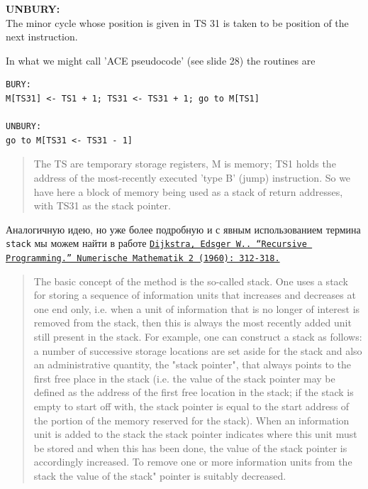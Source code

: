 \textbf{UNBURY:}\\
The minor cycle whose position is given in TS 31 is taken to be position of the next instruction.

In what we might call 'ACE pseudocode' (see slide 28) the routines are
\begin{lstlisting}[caption={}, label={}, style=style_code_block]
BURY:
M[TS31] <- TS1 + 1; TS31 <- TS31 + 1; go to M[TS1]

UNBURY:
go to M[TS31 <- TS31 - 1]
\end{lstlisting}

\begin{quotation}
  The TS are temporary storage registers, M is memory; TS1 holds the address of the most-recently executed 'type B' (jump) instruction. So we have here a block of memory being used as a stack of return addresses, with TS31 as the stack pointer.
\end{quotation}

Аналогичную идею, но уже более подробную и с явным использованием термина \texttt{stack} мы можем найти в работе \href{https://www.semanticscholar.org/paper/Recursive-Programming-Dijkstra/ff5f9f796a8e0f1908423fab7bebd63f3a8e2f76}{\textcolor{UrlColorText}{\texttt{Dijkstra, Edsger W.. “Recursive Programming.” Numerische Mathematik 2 (1960): 312-318.}}}
\begin{quotation}
  The basic concept of the method is the so-called stack. One uses a stack for storing a sequence of information units that increases and decreases at one end only, i.e. when a unit of information that is no longer of interest is removed from the stack, then this is always the most recently added unit still present in the stack. For example, one can construct a stack as follows: a number of successive storage locations are set aside for the stack and also an administrative quantity, the "stack pointer"{}, that always points to the first free place in the stack (i.e. the value of the stack pointer may be defined as the address of the first free location in the stack; if the stack is empty to start off with, the stack pointer is equal to the start address of the portion of the memory reserved for the stack). When an information unit is added to the stack the stack pointer indicates where this unit must be stored and when this has been done, the value of the stack pointer is accordingly increased. To remove one or more information units from the stack the value of the stack" pointer is suitably decreased.
\end{quotation}

